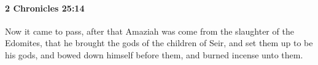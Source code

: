 
		\paragraph{2 Chronicles 25:14} %
			\label{2CHRONICLES-25-14}

			Now it came to pass, after that Amaziah was come from the slaughter of the Edomites, that he brought the gods of the children of Seir, and set them up to be his gods, and bowed down himself before them, and burned incense unto them.


